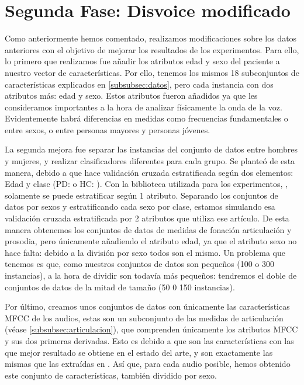 \section{Segunda Fase: Disvoice modificado}
Como anteriormente hemos comentado, realizamos modificaciones sobre los datos anteriores con el objetivo de mejorar los resultados de los experimentos. Para ello, lo primero que realizamos fue añadir los atributos edad y sexo del paciente a nuestro vector de características. Por ello, tenemos los mismos 18 subconjuntos de características explicados en \ref{subsubsec:datos}, pero cada instancia con dos atributos más: edad y sexo. Estos atributos fueron añadidos ya que les consideramos importantes a la hora de analizar físicamente la onda de la voz. Evidentemente habrá diferencias en medidas como frecuencias fundamentales o  entre sexos, o entre personas  mayores y personas jóvenes.

La segunda mejora fue separar las instancias del conjunto de datos entre hombres y mujeres, y realizar clasificadores diferentes para cada grupo. Se planteó de esta manera, debido a que \cite{Orz2016} hace validación cruzada estratificada según dos elementos: Edad y clase (PD:  o HC: ). Con la biblioteca utilizada para los experimentos, , solamente se puede estratificar según 1 atributo. Separando los conjuntos de datos por sexos y estratificando cada sexo por clase, estamos simulando esa validación cruzada estratificada por 2 atributos que utiliza ese artículo. De esta manera obtenemos los conjuntos de datos de medidas de fonación articulación y prosodia, pero únicamente añadiendo el atributo edad, ya que el atributo sexo no hace falta: debido a la división por sexo todos son el mismo. Un problema que tenemos es que, como nuestros conjuntos de datos son pequeños (100 o 300 instancias), a la hora de dividir son todavía más pequeños: tendremos el doble de conjuntos de datos de la mitad de tamaño (50 0 150 instancias).

Por último, creamos unos conjuntos de datos con únicamente las características MFCC de los audios, estas son un subconjunto de las medidas de articulación (véase \ref{subsubsec:articulacion}), que comprenden únicamente los atributos MFCC y sus dos primeras derivadas. Esto es debido a que son las características con las que mejor resultado se obtiene en el estado del arte, y son exactamente las mismas que las extraídas en \cite{Orz2016}. Así que, para cada audio posible, hemos obtenido este conjunto de características, también dividido por sexo.


